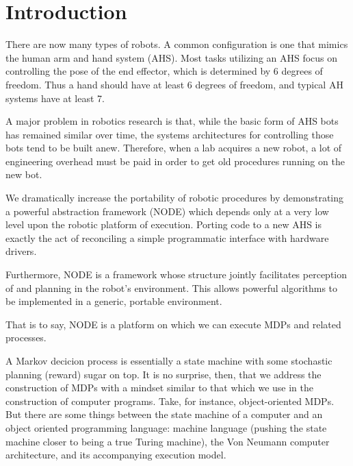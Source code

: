 \documentclass[conference]{IEEEtran}
\begin{document}
\section{Introduction}



There are now many types of robots. A common configuration is one that mimics
the human arm and hand system (AHS).  Most tasks utilizing an AHS focus on controlling the
pose of the end effector, which is determined by 6 degrees of freedom.  Thus a hand should have 
at least 6 degrees of freedom, and typical AH systems have at least 7.

A major problem in robotics research is that, while the basic form of AHS bots has remained
similar over time, the systems architectures for controlling those bots tend to be built 
anew. Therefore, when a lab acquires a new robot, a lot of engineering overhead must be paid
in order to get old procedures running on the new bot.

We dramatically increase the portability of robotic procedures by demonstrating a powerful
abstraction framework (NODE) which depends only at a very low level upon the robotic platform
of execution. Porting code to a new AHS is exactly the act of reconciling a simple programmatic
interface with hardware drivers.

Furthermore, NODE is a framework whose structure jointly facilitates perception of 
and planning in the robot's environment. This allows powerful algorithms to be implemented in a
generic, portable environment.

That is to say, NODE is a platform on which we can execute MDPs and related processes.

A Markov decicion process is essentially a state machine with some stochastic planning (reward)
sugar on top. It is no surprise, then, that we address the construction of MDPs with a mindset similar
to that which we use in the construction of computer programs. Take, for instance, object-oriented MDPs. But there
are some things between the state machine of a computer and an object oriented programming language:
machine language (pushing the state machine closer to being a true Turing machine), the Von Neumann computer 
architecture, and its accompanying execution model.
\end{document}
